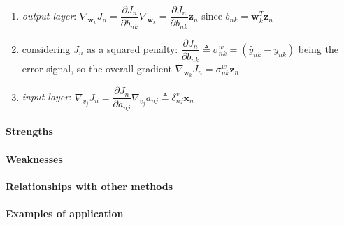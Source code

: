 \begin{enumerate}
    \item \emph{output layer}: $\nabla_{\bm{w}_{k}}J_{n} = \dfrac{\partial J_{n}}{\partial b_{nk}}
        \nabla_{\bm{w}_{k}} = \dfrac{\partial J_{n}}{\partial b_{nk}}\bm{z}_{n}$ since $b_{nk}=\bm{
        w}_{k}^{T}\bm{z}_{n}$
    \item considering $J_{n}$ as a squared penalty: $\dfrac{\partial J_{n}}{\partial b_{nk}} 
        \triangleq \sigma_{nk}^{w}=(\hat{y}_{nk}-y_{nk})$ being the error signal, so the overall 
        gradient $\nabla_{\bm{w}_{k}}J_{n} = \sigma^{w}_{nk}\bm{z}_{n}$
    \item \emph{input layer}: $\nabla_{v_{j}}J_{n}=\dfrac{\partial J_{n}}{\partial a_{nj}}
        \nabla_{v_{j}}a_{nj}\triangleq \delta_{nj}^{v}\bm{x}_{n}$
\end{enumerate}



\paragraph{Strengths}
\paragraph{Weaknesses}
\paragraph{Relationships with other methods}
\paragraph{Examples of application}


